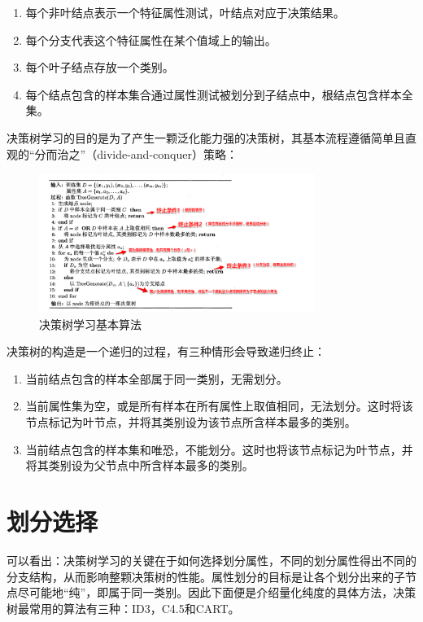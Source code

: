 \documentclass[12pt, a4paper]{article} %
\begin{document}
\begin{enumerate}[\hspace*{2em} i.]
    \item 每个非叶结点表示一个特征属性测试，叶结点对应于决策结果。
    \item 每个分支代表这个特征属性在某个值域上的输出。
    \item 每个叶子结点存放一个类别。
    \item 每个结点包含的样本集合通过属性测试被划分到子结点中，根结点包含样本全集。
\end{enumerate}

决策树学习的目的是为了产生一颗泛化能力强的决策树，其基本流程遵循简单且直观的“分而治之”（divide-and-conquer）策略：

\begin{figure}[H]
    \centering
    \includegraphics[width=0.8\textwidth]{../img/4-2-决策树学习基本算法.png}
    \caption{决策树学习基本算法}
    \label{fig:决策树学习基本算法}
\end{figure}

决策树的构造是一个递归的过程，有三种情形会导致递归终止：

\begin{enumerate}[\hspace*{2em} i.]
    \item 当前结点包含的样本全部属于同一类别，无需划分。
    \item 当前属性集为空，或是所有样本在所有属性上取值相同，无法划分。这时将该节点标记为叶节点，并将其类别设为该节点所含样本最多的类别。
    \item 当前结点包含的样本集和唯恐，不能划分。这时也将该节点标记为叶节点，并将其类别设为父节点中所含样本最多的类别。
\end{enumerate}

\section{划分选择}

可以看出：决策树学习的关键在于如何选择划分属性，不同的划分属性得出不同的分支结构，从而影响整颗决策树的性能。属性划分的目标是让各个划分出来的子节点尽可能地“纯”，即属于同一类别。因此下面便是介绍量化纯度的具体方法，决策树最常用的算法有三种：ID3，C4.5和CART。
\end{document}
